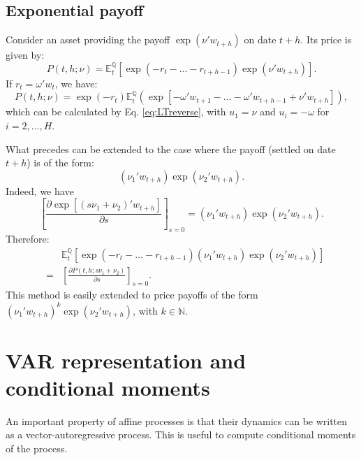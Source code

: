 \documentclass[
  12pt,
]{book}
\theoremstyle{definition}
\theoremstyle{definition}
\theoremstyle{definition}
\theoremstyle{definition}
\theoremstyle{remark}
\begin{document}
\hypertarget{ExponentialPayoff}{%
\subsection{Exponential payoff}\label{ExponentialPayoff}}

Consider an asset providing the payoff \(\exp(\nu' w_{t+h})\) on date \(t+h\). Its price is given by:
\[
P(t,h;\nu) = \mathbb{E}^{\mathbb{Q}}_t[\exp(-r_{t}-\dots-r_{t+h-1}) \exp(\nu' w_{t+h})].
\]
If \(r_t = \omega'w_t\), we have:
\[
P(t,h;\nu) = \exp(-r_{t})\mathbb{E}^{\mathbb{Q}}_t \left(\exp[-\omega' w_{t+1}-\dots-\omega' w_{t+h-1}+ \nu' w_{t+h}]\right),
\]
which can be calculated by Eq. \eqref{eq:LTreverse}, with \(u_1 = \nu\) and \(u_i = -\omega\) for \(i = 2,\dots,H\).

What precedes can be extended to the case where the payoff (settled on date \(t+h\)) is of the form:
\[
(\nu_1'w_{t+h}) \exp(\nu_2' w_{t+h}).
\]
Indeed, we have
\[
\left[\frac{\partial \exp[(s \nu_1+ \nu_2)'w_{t+h}]}{\partial s}\right]_{s=0} = (\nu_1'w_{t+h}) \exp(\nu_2' w_{t+h}).
\]
Therefore:
\begin{eqnarray}
&&\mathbb{E}_t^{\mathbb{Q}}[\exp(-r_t - \dots - r_{t+h-1})(\nu_1'w_{t+h}) \exp(\nu_2' w_{t+h})] \nonumber\\
&=& \left[
\frac{\partial P(t,h;s \nu_1 + \nu_2)}{\partial s}
\right]_{s=0}.\label{eq:Affineexppayoff}
\end{eqnarray}
This method is easily extended to price payoffs of the form \((\nu_1'w_{t+h})^k \exp(\nu_2' w_{t+h})\), with \(k \in \mathbb{N}\).

\hypertarget{var-representation-and-conditional-moments}{%
\section{VAR representation and conditional moments}\label{var-representation-and-conditional-moments}}

An important property of affine processes is that their dynamics can be written as a vector-autoregressive process. This is useful to compute conditional moments of the process.
\end{document}
